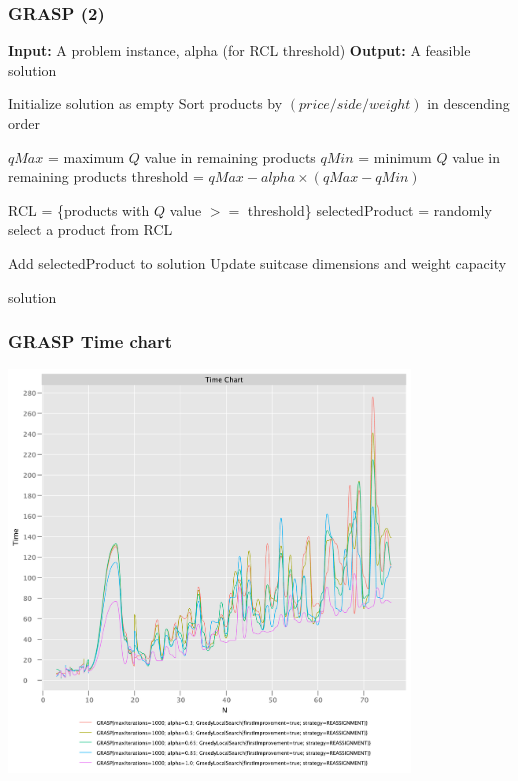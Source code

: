 \documentclass{beamer}
\begin{document}
\begin{frame}[fragile] 
\frametitle{GRASP (2)}
\begin{algorithm}
\begin{algorithmic}
    \State \textbf{Input:} A problem instance, alpha (for RCL threshold)
    \State \textbf{Output:} A feasible solution

    \State Initialize solution as empty
    \State Sort products by $(price / side / weight)$ in descending order

        \State $qMax$ = maximum $Q$ value in remaining products
        \State $qMin$ = minimum $Q$ value in remaining products
        \State threshold = $qMax - alpha \times (qMax - qMin)$

        \State RCL = \{products with $Q$ value $>=$ threshold\}
        \State selectedProduct = randomly select a product from RCL

            \State Add selectedProduct to solution
            \State Update suitcase dimensions and weight capacity
        \EndIf
    \EndWhile

    \State \Return solution
\end{algorithmic}
\end{algorithm}

\end{frame}

\begin{frame}
\frametitle{GRASP Time chart}
\includegraphics[width=0.8\textwidth]{./documentation/assets/new.GRASPParams.timeChart.pdf}
\end{frame}
\end{document}
